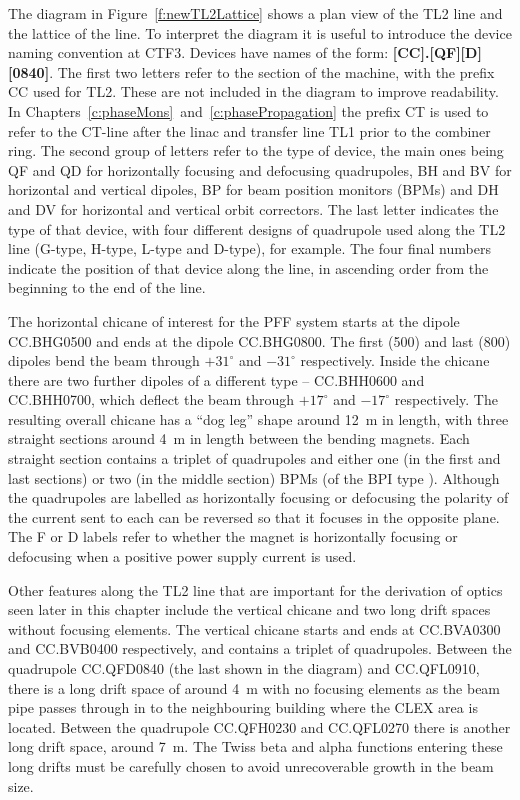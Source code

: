The diagram in Figure~\ref{f:newTL2Lattice} shows a plan view of the TL2 line and the lattice of the line. To interpret the diagram it is useful to introduce the device naming convention at CTF3. Devices have names of the form: \textbf{[CC].[QF][D][0840]}. The first two letters refer to the section of the machine, with the prefix CC used for TL2. These are not included in the diagram to improve readability. In Chapters~\ref{c:phaseMons}~and~\ref{c:phasePropagation} the prefix CT is used to refer to the CT-line after the linac and transfer line TL1 prior to the combiner ring. The second group of letters refer to the type of device, the main ones being QF and QD for horizontally focusing and defocusing quadrupoles, BH and BV for horizontal and vertical dipoles, BP for beam position monitors (BPMs) and DH and DV for horizontal and vertical orbit correctors. The last letter indicates the type of that device, with four different designs of quadrupole used along the TL2 line (G-type, H-type, L-type and D-type), for example. The four final numbers indicate the position of that device along the line, in ascending order from the beginning to the end of the line.

The horizontal chicane of interest for the PFF system starts at the dipole CC.BHG0500 and ends at the dipole CC.BHG0800. The first (500) and last (800) dipoles bend the beam through \(+31^\circ\) and \(-31^\circ\) respectively. Inside the chicane there are two further dipoles of a different type -- CC.BHH0600 and CC.BHH0700, which deflect the beam through \(+17^\circ\) and \(-17^\circ\) respectively. 
The resulting overall chicane has a ``dog leg'' shape around 12~m in length, with three straight sections around 4~m in length between the bending magnets. Each straight section contains a triplet of quadrupoles and either one (in the first and last sections) or two (in the middle section) BPMs (of the BPI type \cite{bpi}). Although the quadrupoles are labelled as horizontally focusing or defocusing the polarity of the current sent to each can be reversed so that it focuses in the opposite plane. The F or D labels refer to whether the magnet is horizontally focusing or defocusing when a positive power supply current is used.

Other features along the TL2 line that are important for the derivation of optics seen later in this chapter include the vertical chicane and two long drift spaces without focusing elements. The vertical chicane starts and ends at CC.BVA0300 and CC.BVB0400 respectively, and contains a triplet of quadrupoles. Between the quadrupole CC.QFD0840 (the last shown in the diagram) and CC.QFL0910, there is a long drift space of around 4~m with no focusing elements as the beam pipe passes through in to the neighbouring building where the CLEX area is located. Between the quadrupole CC.QFH0230 and CC.QFL0270 there is another long drift space, around 7~m. The Twiss beta and alpha functions entering these long drifts must be carefully chosen to avoid unrecoverable growth in the beam size.

